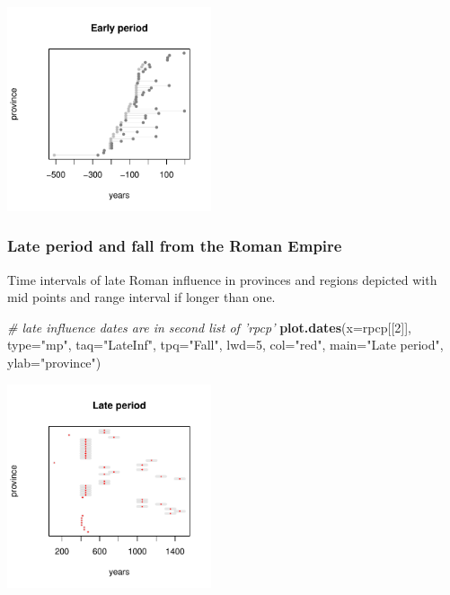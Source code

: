 \documentclass[a4paper,11pt]{memoir}
\newenvironment{Shaded}{\begin{snugshade}}{\end{snugshade}}
\newcommand{\CommentTok}[1]{\textcolor[rgb]{0.56,0.35,0.01}{\textit{#1}}}
\newcommand{\DataTypeTok}[1]{\textcolor[rgb]{0.13,0.29,0.53}{#1}}
\newcommand{\DecValTok}[1]{\textcolor[rgb]{0.00,0.00,0.81}{#1}}
\newcommand{\KeywordTok}[1]{\textcolor[rgb]{0.13,0.29,0.53}{\textbf{#1}}}
\newcommand{\NormalTok}[1]{#1}
\newcommand{\StringTok}[1]{\textcolor[rgb]{0.31,0.60,0.02}{#1}}
\begin{document}
\begin{center}
\centering
\includegraphics[width=6cm, trim=0 0 0 0, clip]{img/unnamed-chunk-22-1} 
\end{center}

\hypertarget{late-period-and-fall-from-the-roman-empire}{%
\subsubsection{Late period and fall from the Roman
Empire}\label{late-period-and-fall-from-the-roman-empire}}

Time intervals of late Roman influence in provinces and regions depicted
with mid points and range interval if longer than one.

\begin{Shaded}
\begin{Highlighting}[]
\CommentTok{# late influence dates are in second list of 'rpcp'}
\KeywordTok{plot.dates}\NormalTok{(}\DataTypeTok{x=}\NormalTok{rpcp[[}\DecValTok{2}\NormalTok{]], }\DataTypeTok{type=}\StringTok{"mp"}\NormalTok{, }\DataTypeTok{taq=}\StringTok{"LateInf"}\NormalTok{, }\DataTypeTok{tpq=}\StringTok{"Fall"}\NormalTok{, }\DataTypeTok{lwd=}\DecValTok{5}\NormalTok{, }\DataTypeTok{col=}\StringTok{"red"}\NormalTok{, }
           \DataTypeTok{main=}\StringTok{"Late period"}\NormalTok{, }\DataTypeTok{ylab=}\StringTok{"province"}\NormalTok{)}
\end{Highlighting}
\end{Shaded}

\begin{center}
\centering
\includegraphics[width=6cm, trim=0 0 0 0, clip]{img/unnamed-chunk-24-1} 
\end{center}
\end{document}

